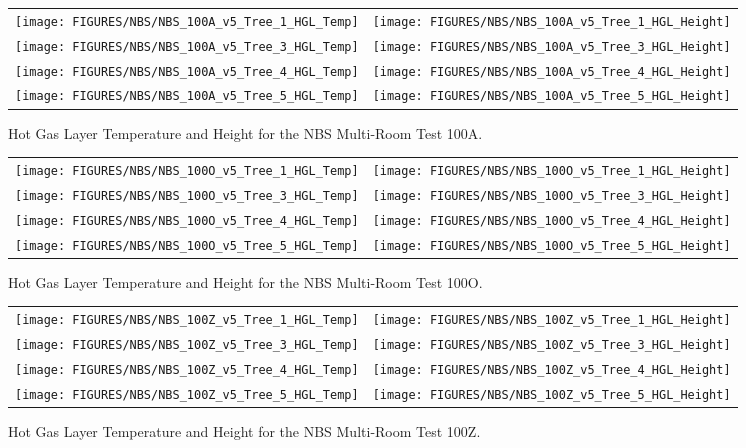 \begin{figure}[p]
\begin{tabular*}{\textwidth}{l@{\extracolsep{\fill}}r}
\texttt{[image: FIGURES/NBS/NBS\_100A\_v5\_Tree\_1\_HGL\_Temp]} &
\texttt{[image: FIGURES/NBS/NBS\_100A\_v5\_Tree\_1\_HGL\_Height]} \\
\texttt{[image: FIGURES/NBS/NBS\_100A\_v5\_Tree\_3\_HGL\_Temp]} &
\texttt{[image: FIGURES/NBS/NBS\_100A\_v5\_Tree\_3\_HGL\_Height]} \\
\texttt{[image: FIGURES/NBS/NBS\_100A\_v5\_Tree\_4\_HGL\_Temp]} &
\texttt{[image: FIGURES/NBS/NBS\_100A\_v5\_Tree\_4\_HGL\_Height]} \\
\texttt{[image: FIGURES/NBS/NBS\_100A\_v5\_Tree\_5\_HGL\_Temp]} &
\texttt{[image: FIGURES/NBS/NBS\_100A\_v5\_Tree\_5\_HGL\_Height]}
\end{tabular*}
\caption{Hot Gas Layer Temperature and Height for the NBS Multi-Room Test 100A.} \label{NBS_100A_HGL}
\end{figure}

\begin{figure}[p]
\begin{tabular*}{\textwidth}{l@{\extracolsep{\fill}}r}
\texttt{[image: FIGURES/NBS/NBS\_100O\_v5\_Tree\_1\_HGL\_Temp]} &
\texttt{[image: FIGURES/NBS/NBS\_100O\_v5\_Tree\_1\_HGL\_Height]} \\
\texttt{[image: FIGURES/NBS/NBS\_100O\_v5\_Tree\_3\_HGL\_Temp]} &
\texttt{[image: FIGURES/NBS/NBS\_100O\_v5\_Tree\_3\_HGL\_Height]} \\
\texttt{[image: FIGURES/NBS/NBS\_100O\_v5\_Tree\_4\_HGL\_Temp]} &
\texttt{[image: FIGURES/NBS/NBS\_100O\_v5\_Tree\_4\_HGL\_Height]} \\
\texttt{[image: FIGURES/NBS/NBS\_100O\_v5\_Tree\_5\_HGL\_Temp]} &
\texttt{[image: FIGURES/NBS/NBS\_100O\_v5\_Tree\_5\_HGL\_Height]}
\end{tabular*}
\caption{Hot Gas Layer Temperature and Height for the NBS Multi-Room Test 100O.} \label{NBS_100O_HGL}
\end{figure}

\begin{figure}[p]
\begin{tabular*}{\textwidth}{l@{\extracolsep{\fill}}r}
\texttt{[image: FIGURES/NBS/NBS\_100Z\_v5\_Tree\_1\_HGL\_Temp]} &
\texttt{[image: FIGURES/NBS/NBS\_100Z\_v5\_Tree\_1\_HGL\_Height]} \\
\texttt{[image: FIGURES/NBS/NBS\_100Z\_v5\_Tree\_3\_HGL\_Temp]} &
\texttt{[image: FIGURES/NBS/NBS\_100Z\_v5\_Tree\_3\_HGL\_Height]} \\
\texttt{[image: FIGURES/NBS/NBS\_100Z\_v5\_Tree\_4\_HGL\_Temp]} &
\texttt{[image: FIGURES/NBS/NBS\_100Z\_v5\_Tree\_4\_HGL\_Height]} \\
\texttt{[image: FIGURES/NBS/NBS\_100Z\_v5\_Tree\_5\_HGL\_Temp]} &
\texttt{[image: FIGURES/NBS/NBS\_100Z\_v5\_Tree\_5\_HGL\_Height]}
\end{tabular*}
\caption{Hot Gas Layer Temperature and Height for the NBS Multi-Room Test 100Z.} \label{NBS_100Z_HGL}
\end{figure}

\clearpage

